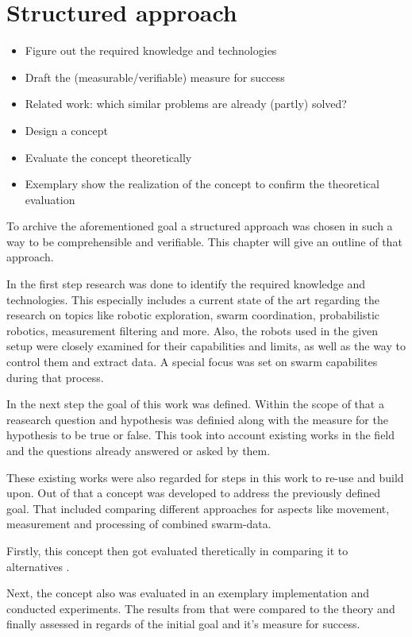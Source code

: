 \section{Structured approach}
\begin{itemize}
	\item{Figure out the required knowledge and technologies}
	\item{Draft the (measurable/verifiable) measure for success}
	\item{Related work: which similar problems are already (partly) solved?}
	\item{Design a concept}
	\item{Evaluate the concept theoretically}
	\item{Exemplary show the realization of the concept to confirm the theoretical evaluation}
\end{itemize}

To archive the aforementioned goal a structured approach was chosen in such a way to be comprehensible and verifiable. This chapter will give an outline of that approach.

In the first step research was done to identify the required knowledge and technologies. This especially includes a current state of the art regarding the research on topics like robotic exploration, swarm coordination, probabilistic robotics, measurement filtering and more. Also, the robots used in the given setup were closely examined for their capabilities and limits, as well as the way to control them and extract data. A special focus was set on swarm capabilites during that process.

In the next step the goal of this work was defined. Within the scope of that a reasearch question and hypothesis was definied along with the measure for the hypothesis to be true or false. This took into account existing works in the field and the questions already answered or asked by them.

These existing works were also regarded for steps in this work to re-use and build upon. Out of that a concept was developed to address the previously defined goal. That included comparing different approaches for aspects like movement, measurement and processing of combined swarm-data.

Firstly, this concept then got evaluated theretically in comparing it to alternatives .

Next, the concept also was evaluated in an exemplary implementation and conducted experiments. The results from that were compared to the theory and finally assessed in regards of the initial goal and it's measure for success.
